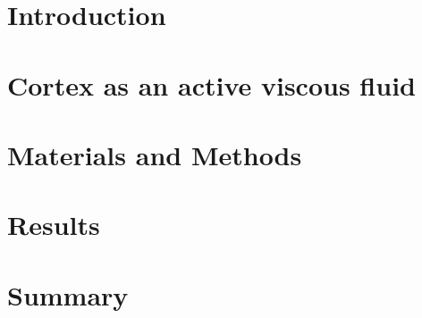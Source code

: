 \documentclass[
    BCOR=6mm,
    DIV=13,
    draft=false,
    titlepage=true,
    twoside=false,
    toc=bib,
    parskip=half-,
    chapterprefix=true,
    appendixprefix=true,
    footnotes=multiple,
    headsepline=true]{scrreprt}
\begin{document}
\pagestyle{scrheadings}

\tableofcontents
\listoffigures


\lipsum[10]

\cleardoubleoddpage
{}

\chapter{Introduction}\label{ch:APAxisIntro}


\chapter{Cortex as an active viscous fluid}\label{ch:ActiveMatter} %
\lipsum[80]

\chapter{Materials and Methods}\label{ch:Exp}


\chapter{Results}\label{ch:Results}


\chapter{Summary}\label{ch:Summary}
\lipsum[80]

\printbibliography[title={Bibliography}]
\end{document}
